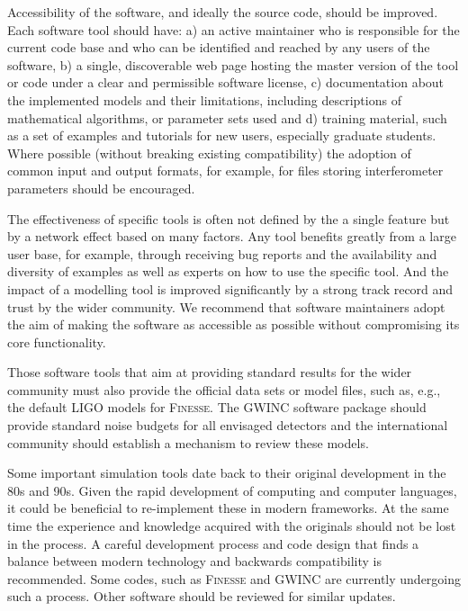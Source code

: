 Accessibility of the software, and ideally the source code, should be improved. Each software tool should have: a) an active maintainer who is responsible for the current code base and who can be identified and reached by any users of the software, b) a single, discoverable web page hosting the master version of the tool or code under a clear and permissible software license, c) documentation about the implemented models and their limitations, including descriptions of mathematical algorithms, or parameter sets used and d) training material, such as a set of examples and tutorials for new users, especially graduate students. Where possible (without breaking existing compatibility) the adoption of common input and output formats, for example, for files storing interferometer parameters should be encouraged.

The effectiveness of specific tools is often not defined by the a single feature but by a network effect based on many factors. Any tool benefits greatly from a large user base, for example, through receiving bug reports and the availability and diversity of examples as well as experts on how to use the specific tool. And the impact of a modelling tool is improved significantly by a strong track record and trust by the wider community. We recommend that software maintainers adopt the aim of making the software as accessible as possible without compromising its core functionality. %

Those software tools that aim at providing standard results for the wider community must also provide the official data sets or model files, such as, e.g., the default LIGO models for \textsc{Finesse}. The GWINC software package should provide standard noise budgets for all envisaged detectors and the
international community should establish a mechanism to review these models.

Some important simulation tools date back to their original development in the 80s and 90s. Given the rapid development of computing and computer languages, it could be beneficial to re-implement these in modern frameworks. At the same time the experience and knowledge acquired with the originals should not be lost in the process. A careful development process and code design that finds a balance between modern technology and backwards compatibility
is recommended. Some codes, such as \textsc{Finesse} and GWINC are currently undergoing such a process. Other software should be reviewed for similar updates.


